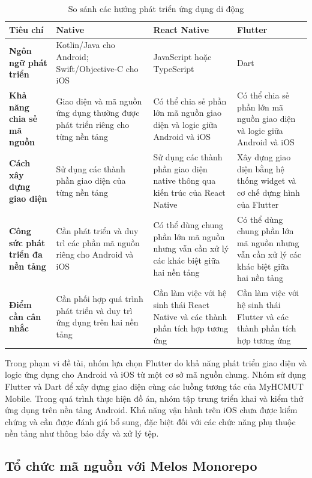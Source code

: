 \begin{table}[H]
\centering
\small
\caption{So sánh các hướng phát triển ứng dụng di động}
\label{tab:compare_mobile_platform}
\begin{tabularx}{\textwidth}{|>{\raggedright\arraybackslash\bfseries}p{2.6cm}|>{\raggedright\arraybackslash}X|>{\raggedright\arraybackslash}X|>{\raggedright\arraybackslash}X|}
\hline
\textbf{Tiêu chí} & \textbf{Native} & \textbf{React Native} & \textbf{Flutter} \\
\hline
Ngôn ngữ phát triển & Kotlin/Java cho Android; Swift/Objective-C cho iOS & JavaScript hoặc TypeScript & Dart \\
\hline
Khả năng chia sẻ mã nguồn & Giao diện và mã nguồn ứng dụng thường được phát triển riêng cho từng nền tảng & Có thể chia sẻ phần lớn mã nguồn giao diện và logic giữa Android và iOS & Có thể chia sẻ phần lớn mã nguồn giao diện và logic giữa Android và iOS \\
\hline
Cách xây dựng giao diện & Sử dụng các thành phần giao diện của từng nền tảng & Sử dụng các thành phần giao diện native thông qua kiến trúc của React Native & Xây dựng giao diện bằng hệ thống widget và cơ chế dựng hình của Flutter \\
\hline
Công sức phát triển đa nền tảng & Cần phát triển và duy trì các phần mã nguồn riêng cho Android và iOS & Có thể dùng chung phần lớn mã nguồn nhưng vẫn cần xử lý các khác biệt giữa hai nền tảng & Có thể dùng chung phần lớn mã nguồn nhưng vẫn cần xử lý các khác biệt giữa hai nền tảng \\
\hline
Điểm cần cân nhắc & Cần phối hợp quá trình phát triển và duy trì ứng dụng trên hai nền tảng & Cần làm việc với hệ sinh thái React Native và các thành phần tích hợp tương ứng & Cần làm việc với hệ sinh thái Flutter và các thành phần tích hợp tương ứng \\
\hline
\end{tabularx}
\end{table}

Trong phạm vi đề tài, nhóm lựa chọn Flutter do khả năng phát triển giao diện và logic ứng dụng cho Android và iOS từ một cơ sở mã nguồn chung. Nhóm sử dụng Flutter và Dart để xây dựng giao diện cùng các luồng tương tác của MyHCMUT Mobile. Trong quá trình thực hiện đồ án, nhóm tập trung triển khai và kiểm thử ứng dụng trên nền tảng Android. Khả năng vận hành trên iOS chưa được kiểm chứng và cần được đánh giá bổ sung, đặc biệt đối với các chức năng phụ thuộc nền tảng như thông báo đẩy và xử lý tệp.

\subsection{Tổ chức mã nguồn với Melos Monorepo}
\label{subsec:melos_monorepo}

